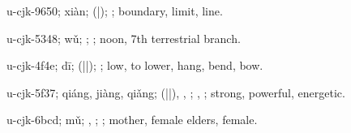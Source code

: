 \begin{multicols}{2}
{\cjkgGlue{}u-cjk-9650; xiàn; \cjkgGlue{}\cjkgGlue{}(\cjkgGlue{}|\cjkgGlue{}); \cjkgGlue{}; boundary, limit, line.

\cjkgGlue{}u-cjk-5348; wǔ; \cjkgGlue{}; \cjkgGlue{}; noon, 7th terrestrial branch.

\cjkgGlue{}u-cjk-4f4e; dī; \cjkgGlue{}\cjkgGlue{}(\cjkgGlue{}|\cjkgGlue{}|\cjkgGlue{}); \cjkgGlue{}; low, to lower, hang, bend, bow.

\cjkgGlue{}u-cjk-5f37; qiáng, jiàng, qiǎng; \cjkgGlue{}\cjkgGlue{}(\cjkgGlue{}|\cjkgGlue{}|\cjkgGlue{}), \cjkgGlue{}\cjkgGlue{}\cjkgGlue{}, \cjkgGlue{}\cjkgGlue{}\cjkgGlue{}; \cjkgGlue{}, \cjkgGlue{}; strong, powerful, energetic.

\cjkgGlue{}u-cjk-6bcd; mǔ; \cjkgGlue{}, \cjkgGlue{}; \cjkgGlue{}; mother, female elders, female.

}
\end{multicols}
